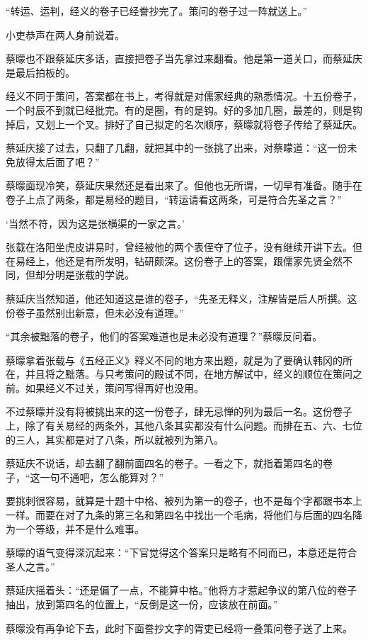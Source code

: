 “转运、运判，经义的卷子已经誊抄完了。策问的卷子过一阵就送上。”

小吏恭声在两人身前说着。

蔡曚也不跟蔡延庆多话，直接把卷子当先拿过来翻看。他是第一道关口，而蔡延庆是最后拍板的。

经义不同于策问，答案都在书上，考得就是对儒家经典的熟悉情况。十五份卷子，一个时辰不到就已经批完。有的是圈，有的是钩。好的多加几圈，最差的，则是钩掉后，又划上一个叉。排好了自己拟定的名次顺序，蔡曚就将卷子传给了蔡延庆。

蔡延庆接了过去，只翻了几翻，就把其中的一张挑了出来，对蔡曚道：“这一份未免放得太后面了吧？”

蔡曚面现冷笑，蔡延庆果然还是看出来了。但他也无所谓，一切早有准备。随手在卷子上点了两条，都是易经的题目，“转运请看这两条，可是符合先圣之言？”

‘当然不符，因为这是张横渠的一家之言。’

张载在洛阳坐虎皮讲易时，曾经被他的两个表侄夺了位子，没有继续开讲下去。但在易经上，他还是有所发明，钻研颇深。这份卷子上的答案，跟儒家先贤全然不同，但却分明是张载的学说。

蔡延庆当然知道，他还知道这是谁的卷子，“先圣无释义，注解皆是后人所撰。这份卷子虽然别出新意，但未必没有道理。”

“其余被黜落的卷子，他们的答案难道也是未必没有道理？”蔡曚反问着。

蔡曚拿着张载与《五经正义》释义不同的地方来出题，就是为了要确认韩冈的所在，并且将之黜落。与只考策问的殿试不同，在地方解试中，经义的顺位在策问之前。如果经义不过关，策问写得再好也没用。

不过蔡曚并没有将被挑出来的这一份卷子，肆无忌惮的列为最后一名。这份卷子上，除了有关易经的两条外，其他八条其实都没有什么问题。而排在五、六、七位的三人，其实都是对了八条，所以就被列为第八。

蔡延庆不说话，却去翻了翻前面四名的卷子。一看之下，就指着第四名的卷子，“这一句不通吧，怎么能算对？”

要挑刺很容易，就算是十题十中格、被列为第一的卷子，也不是每个字都跟书本上一样。而要在对了九条的第三名和第四名中找出一个毛病，将他们与后面的四名降为一个等级，并不是什么难事。

蔡曚的语气变得深沉起来：“下官觉得这个答案只是略有不同而已，本意还是符合圣人之言。”

蔡延庆摇着头：“还是偏了一点，不能算中格。”他将方才惹起争议的第八位的卷子抽出，放到第四名的位置上，“反倒是这一份，应该放在前面。”

蔡曚没有再争论下去，此时下面誊抄文字的胥吏已经将一叠策问卷子送了上来。

